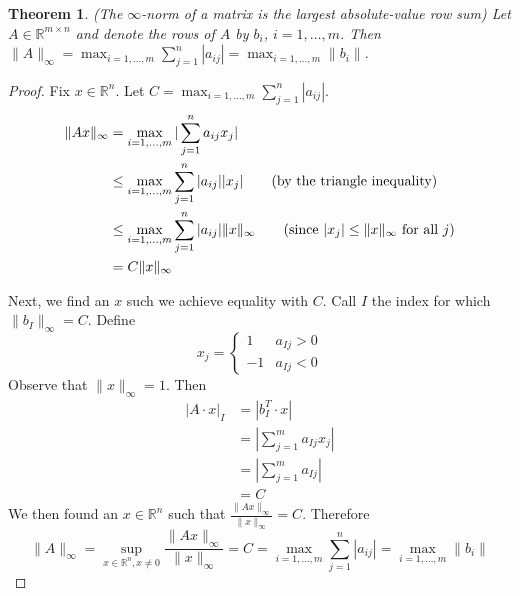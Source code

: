 \documentclass[12pt]{article}
\newtheorem{theorem}{Theorem}
\theoremstyle{definition}
\newcommand{\R}{\mathbb{R}}
\newcommand{\norm}[1]{\lVert#1\rVert}
\begin{document}
\begin{theorem}(The $\infty$-norm of a matrix is the largest absolute-value row sum)
Let $A \in \R^{m \times n }$ and denote the rows of $A$ by $b_i$, $i=1, \ldots, m$. Then $\norm{A}_{\infty} = \max_{i=1, \ldots, m} \sum_{j=1}^{n} |a_{ij}| =  \max_{i=1, \ldots, m} \norm{b_i}$.
\end{theorem}
\begin{proof}
Fix $x \in \R^n$. Let $C = \max_{i=1, \ldots, m} \sum_{j=1}^{n} |a_{ij}|$.
\begin{align*}
	\norm{Ax}_{\infty} &= \max_{i=1,\ldots,m} |\sum_{j=1}^n a_{ij} x_j| \\
	&\leq \max_{i=1,\ldots,m} \sum_{j=1}^n |a_{ij}| |x_j| \tag{by the triangle inequality} \\
	&\leq  \max_{i=1,\ldots,m} \sum_{j=1}^n |a_{ij}| \norm{x}_{\infty} \tag{since $|x_j| \leq \norm{x}_{\infty}$ for all $j$}\\
	&= C \norm{x}_{\infty}
\end{align*}

Next, we find an $x$ such we achieve equality with $C$. Call $I$ the index for which $\norm{b_I}_\infty = C$. Define
\begin{equation}
	x_j = 
	\begin{cases} 
      1 & a_{Ij} > 0 \\
      -1 & a_{Ij} < 0
   \end{cases}
\end{equation}
Observe that $\norm{x}_\infty = 1$. Then
\begin{align*}
	|A\cdot x|_I &= |b_I^T \cdot x| \\
	&=  |\sum_{j=1}^m a_{Ij} x_j | \\
	&= |\sum_{j=1}^m a_{Ij}| \\
	&= C
\end{align*}
We then found an $x \in \R^n$ such that $\frac{\norm{Ax}_\infty}{\norm{x}_\infty} = C$. Therefore 
\begin{equation}
	\norm{A}_\infty = \sup_{x \in \R^n, x\neq 0} \frac{\norm{Ax}_\infty}{\norm{x}_\infty} = C = \max_{i=1, \ldots, m} \sum_{j=1}^{n} |a_{ij}| =  \max_{i=1, \ldots, m} \norm{b_i}
\end{equation}
\end{proof}
\end{document}
